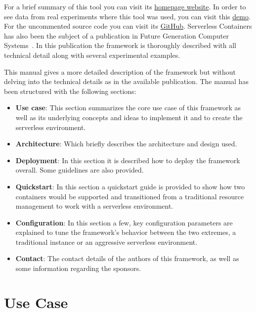\documentclass[12pt]{article}
\begin{document}
For a brief summary of this tool you can visit its \href{http://bdwatchdog.dec.udc.es/serverless/index.html}{homepage website}.
In order to see data from real experiments where this tool was used, you can visit this 
\href{http://bdwatchdog.dec.udc.es/BDWatchdog/TimeseriesViewer/demo.html}{demo}.
For the uncommented source code you can visit its \href{https://github.com/UDC-GAC/ServerlessContainers}{GitHub}.
Serverless Containers has also been the subject of a publication in Future Generation Computer Systems~\cite{enes2020real}. In this publication the framework is thoroughly described with all technical detail along with several experimental examples.

This manual gives a more detailed description of the framework but without delving into the technical details as in the available publication. The manual has been structured with the following sections:
\begin{itemize}
	\item \textbf{Use case}: This section summarizes the core use case of this framework as well as its underlying concepts and ideas to implement it and to create the serverless environment.
	
	\item \textbf{Architecture}: Which briefly describes the architecture and design used.

	\item \textbf{Deployment}: In this section it is described how to deploy the framework overall. Some guidelines are also provided.

	\item \textbf{Quickstart}: In this section a quickstart guide is provided to show how two containers would be supported and transitioned from a traditional resource management to work with a serverless environment.

	\item \textbf{Configuration}: In this section a few, key configuration parameters are explained to tune the framework's behavior between the two extremes, a traditional instance or an aggressive serverless environment.
	
	\item \textbf{Contact}: The contact details of the authors of this framework, as well as some information regarding the sponsors.
\end{itemize}

\section{Use Case}
\end{document}
